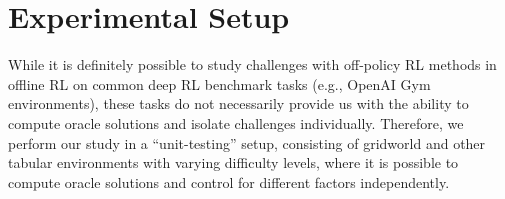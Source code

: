 \vspace{-0.2cm}
\section{Experimental Setup}
\label{sec:diagnosing_setup}
\vspace{-0.2cm}

While it is definitely possible to study challenges with off-policy RL methods in offline RL on common deep RL benchmark tasks (e.g., OpenAI Gym~\citep{gym} environments), these tasks do not necessarily provide us with the ability to compute oracle solutions and isolate challenges individually. Therefore, we perform our study in a ``unit-testing'' setup, consisting of gridworld and other tabular environments with varying difficulty levels, where it is possible to compute oracle solutions and control for different factors independently.




